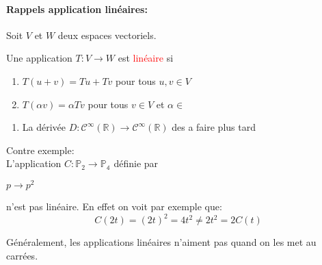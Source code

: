 \paragraph{Rappels application linéaires:}
Soit $V$ et $W$ deux espaces vectoriels.
\begin{definition}
    Une application $T : V \to W$ est \textcolor{red}{linéaire} si
    \begin{enumerate}
        \item $T(u + v) = Tu + Tv$ pour tous $u, v \in V$
        \item $T(\alpha v) = \alpha Tv$ pour tous $v \in V$ et $\alpha \in $\R
    \end{enumerate}
\end{definition}
\begin{exemple}
    \begin{enumerate}
        \item La dérivée $D : \mathcal{C}^\infty(\mathbb{R}) \to \mathcal{C}^\infty(\mathbb{R}) $ des a faire plus tard
    \end{enumerate}

    Contre exemple:
    \\ 
    L'application $C : \mathbb{P}_2 \to \mathbb{P_4}$ définie par 
    \begin{formule}
\begin{center}
    $p \to p^2$
    \end{center}

    \end{formule}
    n'est pas linéaire. En effet on voit par exemple que:
    \[C(2t) = (2t)^2 = 4t^2 \neq 2t^2 = 2C(t)\]
    \begin{framedremark}
        Généralement, les applications linéaires n'aiment pas quand on les met au carrées.
    \end{framedremark}
\end{exemple}


